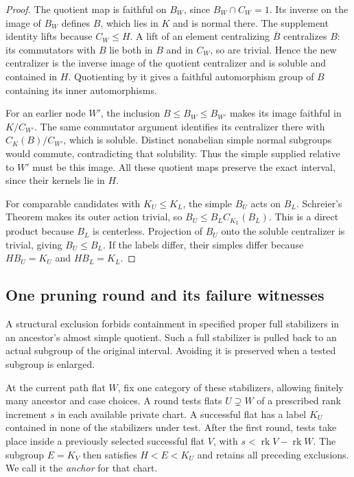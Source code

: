 \begin{proof}
The quotient map is faithful on $B_W$, since $B_W\cap C_W=1$.
Its inverse on the image of $B_W$ defines $B$, which lies in $K$ and is
normal there. The supplement identity lifts because $C_W\le H$.
A lift of an element centralizing $\overline B$ centralizes $B$: its
commutators with $B$ lie both in $B$ and in $C_W$, so are trivial.
Hence the new centralizer is the inverse image of the quotient
centralizer and is soluble and contained in $H$. Quotienting by it gives
a faithful automorphism group of $B$ containing its inner automorphisms.

For an earlier node $W'$, the inclusion $B\le B_W\le B_{W'}$ makes its
image faithful in $K/C_{W'}$. The same commutator argument identifies
its centralizer there with $C_K(B)/C_{W'}$, which is soluble. Distinct
nonabelian simple normal subgroups would commute, contradicting that
solubility. Thus the simple supplied relative to $W'$ must be this image.
All these quotient maps preserve the exact interval, since their kernels
lie in $H$.

For comparable candidates with $K_U\le K_L$, the simple $B_U$ acts on
$B_L$. Schreier's Theorem makes its outer action trivial, so
$B_U\le B_L C_{K_L}(B_L)$. This is a direct product because $B_L$ is
centerless. Projection of $B_U$ onto the soluble centralizer is trivial,
giving $B_U\le B_L$. If the labels differ, their simples differ because
$HB_U=K_U$ and $HB_L=K_L$.
\end{proof}

\subsection{One pruning round and its failure witnesses}

A structural exclusion forbids containment in specified proper full
stabilizers in an ancestor's almost simple quotient. Such a full
stabilizer is pulled back to an actual subgroup of the original interval.
Avoiding it is preserved when a tested subgroup is enlarged.

At the current path flat $W$, fix one category of these stabilizers,
allowing finitely many ancestor and case choices. A round tests flats
$U\supsetneq W$ of a prescribed rank increment $s$ in each available
private chart. A successful flat has a label $K_U$ contained in none of
the stabilizers under test. After the first round, tests take place
inside a previously selected successful flat $V$, with
$s<\operatorname{rk}V-\operatorname{rk}W$. The subgroup $E=K_V$ then
satisfies $H<E<K_U$ and retains all preceding exclusions. We call it the
\emph{anchor} for that chart.

